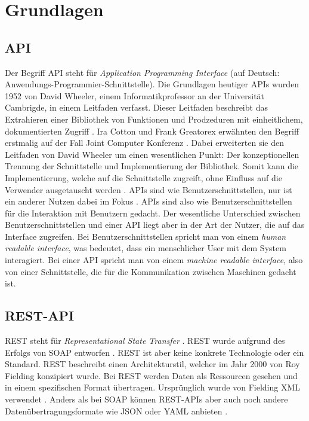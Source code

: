 \chapter{Grundlagen}
\section{API}

Der Begriff API steht für \textit{Application Programming Interface} (auf Deutsch: Anwendungs-Programmier-Schnittstelle).
Die Grundlagen heutiger APIs wurden 1952 von David Wheeler, einem Informatikprofessor an der Universität Cambrigde, in einem Leitfaden verfasst.
Dieser Leitfaden beschreibt das Extrahieren einer Bibliothek von Funktionen und Prodzeduren mit einheitlichem, dokumentierten Zugriff \parencite[S.5-6]{wheeler1952use}.
Ira Cotton und Frank Greatorex erwähnten den Begriff erstmalig auf der Fall Joint Computer Konferenz \parencite[S.5]{cotton1968data}.
Dabei erweiterten sie den Leitfaden von David Wheeler um einen wesentlichen Punkt: Der konzeptionellen Trennung der Schnittstelle und Implementierung der Bibliothek.
Somit kann die Implementierung, welche auf die Schnittstelle zugreift, ohne Einfluss auf die Verwender ausgetauscht werden \parencite[S.2]{kress2020graphql}.
APIs sind wie Benutzerschnittstellen, nur ist ein anderer Nutzen dabei im Fokus \parencite[S.5]{berlind2017apis}.
APIs sind also wie Benutzerschnittstellen für die Interaktion mit Benutzern gedacht.
Der wesentliche Unterschied zwischen Benutzerschnittstellen und einer API liegt aber in der Art der Nutzer, die auf das Interface zugreifen.
Bei Benutzerschnittstellen spricht man von einem \textit{human readable interface}, was bedeutet, dass ein menschlicher User mit dem System interagiert.
Bei einer API spricht man von einem \textit{machine readable interface}, also von einer Schnittstelle, die für die Kommunikation zwischen Maschinen gedacht ist.

\section{REST-API}
REST steht für \textit{Representational State Transfer} \parencite[S.235-236]{wheeler1952use}.
REST wurde aufgrund des Erfolgs von SOAP entworfen \parencite[Abs. REST APIs]{graphcms}.
REST ist aber keine konkrete Technologie oder ein Standard.
REST beschreibt einen Architekturstil, welcher im Jahr 2000 von Roy Fielding konzipiert wurde.
Bei REST werden Daten als Ressourcen gesehen und in einem spezifischen Format übertragen.
Ursprünglich wurde von Fielding XML verwendet \parencite[S.11]{kress2020graphql}.
Anders als bei SOAP können REST-APIs aber auch noch andere Datenübertragungsformate wie JSON oder YAML anbieten \parencite[Abs. REST APIs]{graphcms}.
\newline

